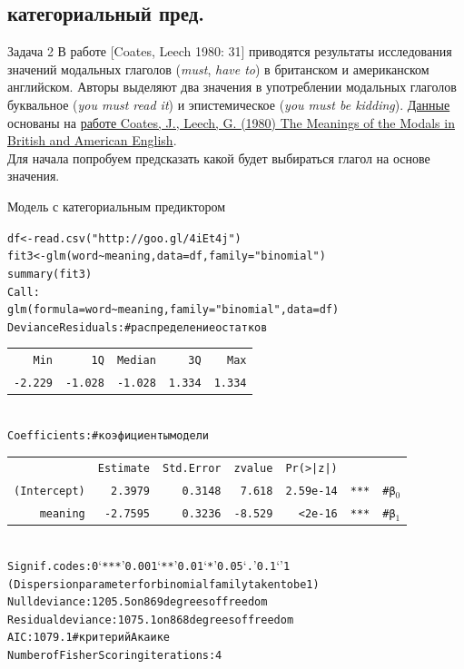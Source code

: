 \subsection{категориальный пред.}
\begin{frame}{Задача 2}
В работе [Coates, Leech 1980: 31] приводятся результаты исследования значений модальных глаголов (\textit{must}, \textit{have to}) в британском и американском английском. Авторы выделяют два значения в употреблении модальных глаголов буквальное (\textit{you must read it}) и эпистемическое (\textit{you must be kidding}). \href{http://goo.gl/4iEt4j}{\alert{Данные}} основаны на \href{http://files.eric.ed.gov/fulltext/ED202217.pdf}{\alert{работе Coates, J., Leech, G. (1980) The Meanings of the Modals in British and American English}}.\\
\vfill
Для начала попробуем предсказать какой будет выбираться глагол на основе значения.
\end{frame}
\begin{frame}{Модель с категориальным предиктором}
\vspace{-5mm}
\scriptsize
\begin{alltt}
df <- read.csv("http://goo.gl/4iEt4j")\\
fit3 <- \alert{glm(word \textasciitilde meaning}, data = df, \alert{family = "binomial")} \\
summary(fit3)\medskip\\
Call:\\
glm(formula = word \textasciitilde meaning, family = "binomial",  data = df)\medskip\\
Deviance Residuals: \hfill \# \alert{распределение остатков} \\
\begin{tabular}{rrrrr}
    Min   &    1Q &  Median  &     3Q &     Max  \\
-2.229  & -1.028 &  -1.028 &  1.334 &  1.334 \\
\end{tabular}
\medskip\\
Coefficients: \hfill \# \alert{коэфициенты модели}\\
\begin{tabular}{rrrrrrr}
    &       \alert{Estimate} & Std. Error & z value & Pr(>|z|)& &\\
\alert{(Intercept)} & \alert{2.3979}    & 0.3148  &  7.618 & 2.59e-14 & ***&\hfill \# \alert{β$_0$}\\
\alert{meaning}  & \alert{-2.7595}     & 0.3236 &  -8.529  & < 2e-16 & *** & \hfill \# \alert{β$_1$}
\end{tabular} \medskip\\
Signif. codes:  0 ‘***’ 0.001 ‘**’ 0.01 ‘*’ 0.05 ‘.’ 0.1 ‘ ’ 1 \medskip\\
(Dispersion parameter for binomial family taken to be 1) \medskip\\
Null deviance: 1205.5  on 869  degrees of freedom\\
Residual deviance: 1075.1  on 868  degrees of freedom\\
AIC: 1079.1 \hfill \# \alert{критерий Акаике}\medskip\\
Number of Fisher Scoring iterations: 4
\end{alltt}
\normalsize
\end{frame}
